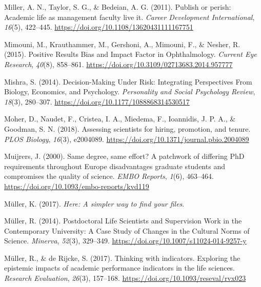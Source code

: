 \documentclass[
  ,man,mask,floatsintext]{apa6}
\newlength{\cslhangindent}
\newlength{\cslentryspacingunit} %
\newenvironment{CSLReferences}[2] %
 {%
  \setlength{\parindent}{0pt}
  \ifodd #1
  \let\oldpar\par
  \def\par{\hangindent=\cslhangindent\oldpar}
  \fi
  \setlength{\parskip}{#2\cslentryspacingunit}
 }%
 {}
\begin{document}
\begin{CSLReferences}{1}{0}
\leavevmode{}%
Miller, A. N., Taylor, S. G., \& Bedeian, A. G. (2011). Publish or perish: Academic life as management faculty live it. \emph{Career Development International}, \emph{16}(5), 422--445. \url{https://doi.org/10.1108/13620431111167751}

\leavevmode{}%
Mimouni, M., Krauthammer, M., Gershoni, A., Mimouni, F., \& Nesher, R. (2015). Positive {Results Bias} and {Impact Factor} in {Ophthalmology}. \emph{Current Eye Research}, \emph{40}(8), 858--861. \url{https://doi.org/10.3109/02713683.2014.957777}

\leavevmode{}%
Mishra, S. (2014). Decision-{Making Under Risk}: {Integrating Perspectives From Biology}, {Economics}, and {Psychology}. \emph{Personality and Social Psychology Review}, \emph{18}(3), 280--307. \url{https://doi.org/10.1177/1088868314530517}

\leavevmode{}%
Moher, D., Naudet, F., Cristea, I. A., Miedema, F., Ioannidis, J. P. A., \& Goodman, S. N. (2018). Assessing scientists for hiring, promotion, and tenure. \emph{PLOS Biology}, \emph{16}(3), e2004089. \url{https://doi.org/10.1371/journal.pbio.2004089}

\leavevmode{}%
Muijrers, J. (2000). Same degree, same effort? {A} patchwork of differing {PhD} requirements throughout {Europe} disadvantages graduate students and compromises the quality of science. \emph{EMBO Reports}, \emph{1}(6), 463--464. \url{https://doi.org/10.1093/embo-reports/kvd119}

\leavevmode{}%
Müller, K. (2017). \emph{Here: {A} simpler way to find your files}.

\leavevmode{}%
Müller, R. (2014). Postdoctoral {Life Scientists} and {Supervision Work} in the {Contemporary University}: {A Case Study} of {Changes} in the {Cultural Norms} of {Science}. \emph{Minerva}, \emph{52}(3), 329--349. \url{https://doi.org/10.1007/s11024-014-9257-y}

\leavevmode{}%
Müller, R., \& de Rijcke, S. (2017). Thinking with indicators. {Exploring} the epistemic impacts of academic performance indicators in the life sciences. \emph{Research Evaluation}, \emph{26}(3), 157--168. \url{https://doi.org/10.1093/reseval/rvx023}


\end{CSLReferences}
\end{document}
